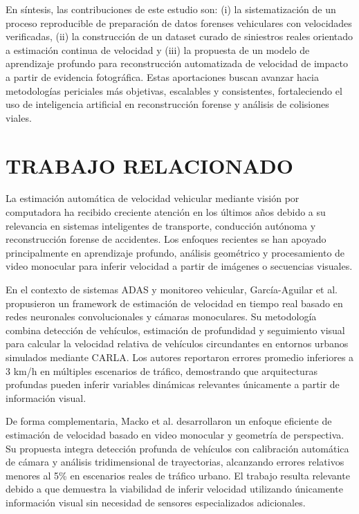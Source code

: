 \documentclass[esp]{cesvi-class}
\begin{document}
En síntesis, las contribuciones de este estudio son: (i) la sistematización de un proceso reproducible de preparación de datos forenses vehiculares con velocidades verificadas, (ii) la construcción de un dataset curado de siniestros reales orientado a estimación continua de velocidad y (iii) la propuesta de un modelo de aprendizaje profundo para reconstrucción automatizada de velocidad de impacto a partir de evidencia fotográfica. Estas aportaciones buscan avanzar hacia metodologías periciales más objetivas, escalables y consistentes, fortaleciendo el uso de inteligencia artificial en reconstrucción forense y análisis de colisiones viales.

\section{TRABAJO RELACIONADO}

La estimación automática de velocidad vehicular mediante visión por computadora ha recibido creciente atención en los últimos años debido a su relevancia en sistemas inteligentes de transporte, conducción autónoma y reconstrucción forense de accidentes. Los enfoques recientes se han apoyado principalmente en aprendizaje profundo, análisis geométrico y procesamiento de video monocular para inferir velocidad a partir de imágenes o secuencias visuales.

En el contexto de sistemas ADAS y monitoreo vehicular, García-Aguilar et al. \cite{Garcia2024Speed} propusieron un framework de estimación de velocidad en tiempo real basado en redes neuronales convolucionales y cámaras monoculares. Su metodología combina detección de vehículos, estimación de profundidad y seguimiento visual para calcular la velocidad relativa de vehículos circundantes en entornos urbanos simulados mediante CARLA. Los autores reportaron errores promedio inferiores a 3 km/h en múltiples escenarios de tráfico, demostrando que arquitecturas profundas pueden inferir variables dinámicas relevantes únicamente a partir de información visual.

De forma complementaria, Macko et al. \cite{Macko2025Speed} desarrollaron un enfoque eficiente de estimación de velocidad basado en video monocular y geometría de perspectiva. Su propuesta integra detección profunda de vehículos con calibración automática de cámara y análisis tridimensional de trayectorias, alcanzando errores relativos menores al 5\% en escenarios reales de tráfico urbano. El trabajo resulta relevante debido a que demuestra la viabilidad de inferir velocidad utilizando únicamente información visual sin necesidad de sensores especializados adicionales.
\end{document}
